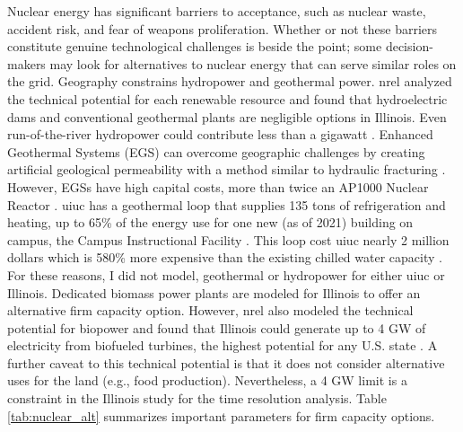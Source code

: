 Nuclear energy has significant barriers to acceptance, such as nuclear waste,
accident risk, and fear of weapons proliferation. Whether or not these barriers
constitute genuine technological challenges is beside the point; some decision-makers
may look for alternatives to nuclear energy that can serve similar roles
on the grid. Geography constrains hydropower and geothermal power. \gls{nrel} analyzed
the technical potential for each renewable resource and found that hydroelectric dams
and conventional geothermal plants are negligible options in Illinois. Even run-of-the-river
hydropower could contribute less than a gigawatt \cite{lopez_us_2012}. Enhanced Geothermal
Systems (EGS) can overcome geographic challenges by creating artificial geological permeability
with a method similar to hydraulic fracturing \cite{geothermal_technologies_office_what_2012}.
However, EGSs have high capital costs, more than twice an AP1000 Nuclear Reactor
\cite{nrel_2020_2020}. \gls{uiuc} has a geothermal loop that supplies 135 tons of refrigeration
and heating, up to 65\% of the energy use for one new (as of 2021) building on campus,
the Campus Instructional Facility \cite{noauthor_geothermal_nodate}.
This loop cost \gls{uiuc} nearly 2 million dollars which is 580\% more expensive
than the existing chilled water capacity
\cite{noauthor_geothermal_nodate,affiliated_engineers_inc_utilities_2015}. For these
reasons, I did not model, geothermal or hydropower for either \gls{uiuc} or Illinois.
Dedicated biomass power plants are modeled for Illinois to offer an alternative
firm capacity option. However, \gls{nrel} also modeled the technical potential for biopower
and found that Illinois could generate up to 4 GW of electricity from biofueled turbines, the highest potential
for any U.S. state \cite{lopez_us_2012}. A further caveat to this technical potential is that it does not
consider alternative uses for the land (e.g., food production). Nevertheless, a 4 GW limit is a constraint in the Illinois study for the time resolution analysis. 
Table \ref{tab:nuclear_alt} summarizes important parameters for firm capacity options.

